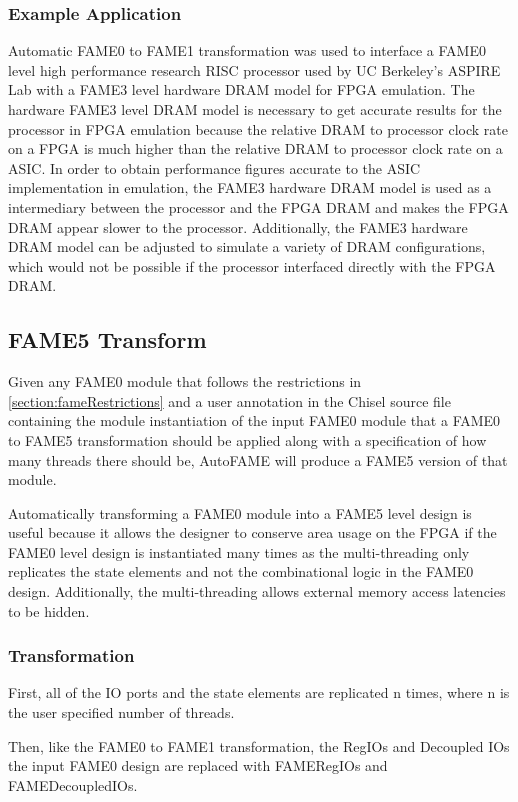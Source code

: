 \subsubsection{Example Application}
Automatic FAME0 to FAME1 transformation was used to interface a FAME0 level high performance research RISC processor used by UC Berkeley's ASPIRE Lab with a FAME3 level hardware DRAM model for FPGA emulation. The hardware FAME3 level DRAM model is necessary to get accurate results for the processor in FPGA emulation because the relative DRAM to processor clock rate on a FPGA is much higher than the relative DRAM to processor clock rate on a ASIC. In order to obtain performance figures accurate to the ASIC implementation in emulation, the FAME3 hardware DRAM model is used as a intermediary between the processor and the FPGA DRAM and makes the FPGA DRAM appear slower to the processor. Additionally, the FAME3 hardware DRAM model can be adjusted to simulate a variety of DRAM configurations, which would not be possible if the processor interfaced directly with the FPGA DRAM.

\subsection{FAME5 Transform}
Given any FAME0 module that follows the restrictions in \ref{section:fameRestrictions} and a user annotation in the Chisel source file containing the module instantiation of the input FAME0 module that a FAME0 to FAME5 transformation should be applied along with a specification of how many threads there should be, AutoFAME will produce a FAME5 version of that module.

Automatically transforming a FAME0 module into a FAME5 level design is useful because it allows the designer to conserve area usage on the FPGA if the FAME0 level design is instantiated many times as the multi-threading only replicates the state elements and not the combinational logic in the FAME0 design. Additionally, the multi-threading allows external memory access latencies to be hidden.

\subsubsection{Transformation}
First, all of the IO ports and the state elements are replicated n times, where n is the user specified number of threads.

Then, like the FAME0 to FAME1 transformation, the RegIOs and Decoupled IOs the input FAME0 design are replaced with FAMERegIOs and FAMEDecoupledIOs.

